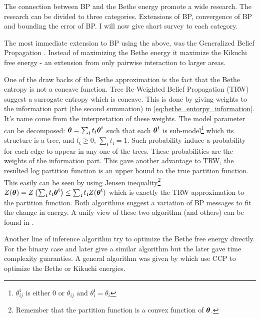 The connection between BP and the Bethe energy promote a wide research.
The research can be divided to three categories.
Extensions of BP, convergence of BP and bounding the error of BP.
I will now give short survey to each category.  

The most immediate extension to BP using the above, was the Generalized Belief Propagation \cite{yedidia2000generalized}. 
Instead of maximizing the Bethe energy it maximize the Kikuchi free energy - an extension from only pairwise interaction to larger areas.

One of the draw backs of the Bethe approximation is the fact that the Bethe entropy is not a concave function.
Tree Re-Weighted Belief Propagation (TRW) \cite{wainwright2003tree} suggest a surrogate entropy  which is concave.
This is done by giving weights to the information part (the second summation) in \eqref{eq:bethe_entorpy_information}.
It's name come from the interpretation of these weights.
The model parameter can be decomposed: $\boldsymbol{\theta}=\sum_{\mathfrak{t}} t_{\mathfrak{t}}\boldsymbol{\theta}^{\mathfrak{t}}$ such that each $\boldsymbol{\theta}^{\mathfrak{t}}$ is sub-model\footnote{$\theta^{\mathfrak{t}}_{ij}$ is either $0$ or $\theta_{ij}$ and $\theta^{\mathfrak{t}}_i =\theta_i$} which its structure is a tree, and $t_{\mathfrak{t}}\geq 0$, $\sum_{\mathfrak{t}} t_{\mathfrak{t}} = 1$.
Such probability induce a probability for each edge to appear in any one of the trees.
These probabilities are the weights of the information part.
This gave another advantage to TRW, the resulted log partition function is an upper bound to the true partition function. 
This easily can be seen by using Jensen inequality\footnote{Remember that the partition function is a convex function of $\boldsymbol{\theta}$.} $Z(\boldsymbol{\theta}) = Z\left(\sum_{\mathfrak{t}} t_{\mathfrak{t}}\boldsymbol{\theta}^{\mathfrak{t}}\right) \leq \sum_{\mathfrak{t}} t_{\mathfrak{t}} Z(\boldsymbol{\theta}^{\mathfrak{t}})$ which is exactly the TRW approximation to the partition function.
Both algorithms suggest a variation of BP messages to fit the change in energy.
A unify view of these two algorithm (and others) can be found in \cite{meshi2009convexifying}.

Another line of inference algorithm try to optimize the Bethe free energy directly.
For the binary case \cite{welling2001belief} and later \cite{shin2012complexity} give a similar algorithm but the later gave time complexity guaranties.
A general algorithm was given by \cite{yuille2002cccp} which use CCP\cite{yuille2002concave} to optimize the Bethe or Kikuchi energies.

